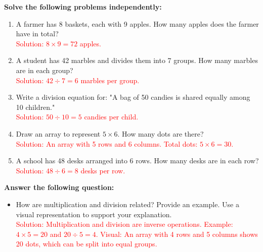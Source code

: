 \documentclass[12pt]{article}
\begin{document}
\begin{tcolorbox}[colframe=black!60, colback=white, 
coltitle=black, colbacktitle=black!15, fonttitle=\bfseries\Large, 
title=Independent Practice, halign title=center, left=10pt, right=10pt, top=10pt, bottom=60pt]
\textbf{Solve the following problems independently:}
\begin{enumerate}[itemsep=5em] %
    \item A farmer has 8 baskets, each with 9 apples. How many apples does the farmer have in total?
    \\ \textcolor{red}{Solution: $8 \times 9 = 72$ apples.}
    \item A student has 42 marbles and divides them into 7 groups. How many marbles are in each group?
    \\ \textcolor{red}{Solution: $42 \div 7 = 6$ marbles per group.}
    \item Write a division equation for: "A bag of 50 candies is shared equally among 10 children."
    \\ \textcolor{red}{Solution: $50 \div 10 = 5$ candies per child.}
    \item Draw an array to represent $5 \times 6$. How many dots are there?
    \\ \textcolor{red}{Solution: An array with 5 rows and 6 columns. Total dots: $5 \times 6 = 30$.}
    \item A school has 48 desks arranged into 6 rows. How many desks are in each row?
    \\ \textcolor{red}{Solution: $48 \div 6 = 8$ desks per row.}
\end{enumerate}
\end{tcolorbox}

\begin{tcolorbox}[colframe=black!60, colback=white, 
coltitle=black, colbacktitle=black!15, fonttitle=\bfseries\Large, 
title=Exit Ticket, halign title=center, left=10pt, right=10pt, top=10pt, bottom=15pt]
\textbf{Answer the following question:}
\begin{itemize}
    \item How are multiplication and division related? Provide an example. Use a visual representation to support your explanation.
    \\ \textcolor{red}{Solution: Multiplication and division are inverse operations. Example: $4 \times 5 = 20$ and $20 \div 5 = 4$. Visual: An array with 4 rows and 5 columns shows 20 dots, which can be split into equal groups.}
\end{itemize}
\vspace{5cm}
\end{tcolorbox}
\end{document}
